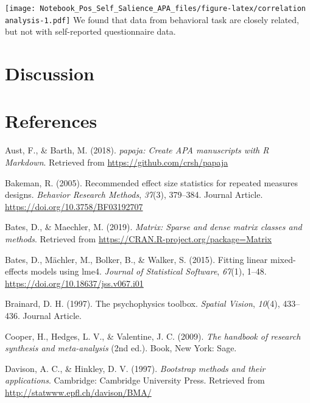 \documentclass[man]{apa6}
\begin{document}
\texttt{[image: Notebook\_Pos\_Self\_Salience\_APA\_files/figure-latex/correlation analysis-1.pdf]}
We found that data from behavioral task are closely related, but not with self-reported questionnaire data.

\hypertarget{discussion}{%
\section{Discussion}\label{discussion}}

\hypertarget{references}{%
\section{References}\label{references}}

\begingroup
\setlength{\parindent}{-0.5in}
\setlength{\leftskip}{0.5in}

\hypertarget{refs}{}
\leavevmode\hypertarget{ref-R-papaja}{}%
Aust, F., \& Barth, M. (2018). \emph{papaja: Create APA manuscripts with R Markdown}. Retrieved from \url{https://github.com/crsh/papaja}

\leavevmode\hypertarget{ref-Bakeman_2015_eff_size}{}%
Bakeman, R. (2005). Recommended effect size statistics for repeated measures designs. \emph{Behavior Research Methods}, \emph{37}(3), 379--384. Journal Article. \url{https://doi.org/10.3758/BF03192707}

\leavevmode\hypertarget{ref-R-Matrix}{}%
Bates, D., \& Maechler, M. (2019). \emph{Matrix: Sparse and dense matrix classes and methods}. Retrieved from \url{https://CRAN.R-project.org/package=Matrix}

\leavevmode\hypertarget{ref-R-lme4}{}%
Bates, D., Mächler, M., Bolker, B., \& Walker, S. (2015). Fitting linear mixed-effects models using lme4. \emph{Journal of Statistical Software}, \emph{67}(1), 1--48. \url{https://doi.org/10.18637/jss.v067.i01}

\leavevmode\hypertarget{ref-Brainard_1997}{}%
Brainard, D. H. (1997). The psychophysics toolbox. \emph{Spatial Vision}, \emph{10}(4), 433--436. Journal Article.

\leavevmode\hypertarget{ref-Cooper_2009_handbook}{}%
Cooper, H., Hedges, L. V., \& Valentine, J. C. (2009). \emph{The handbook of research synthesis and meta-analysis} (2nd ed.). Book, New York: Sage.

\leavevmode\hypertarget{ref-R-boot}{}%
Davison, A. C., \& Hinkley, D. V. (1997). \emph{Bootstrap methods and their applications}. Cambridge: Cambridge University Press. Retrieved from \url{http://statwww.epfl.ch/davison/BMA/}
\end{document}
